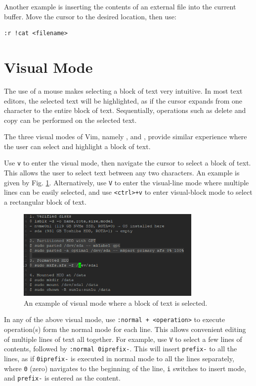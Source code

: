 Another example is inserting the contents of an external file into the current buffer. Move the cursor to the desired location, then use:
\begin{lstlisting}
:r !cat <filename>
\end{lstlisting}

\section{Visual Mode}

The use of a mouse makes selecting a block of text very intuitive. In most text editors, the selected text will be highlighted, as if the cursor expands from one character to the entire block of text. Sequentially, operations such as delete and copy can be performed on the selected text.

The three visual modes of Vim, namely ,  and , provide similar experience where the user can select and highlight a block of text.

Use \verb|v| to enter the visual mode, then navigate the cursor to select a block of text. This allows the user to select text between any two characters. An example is given by Fig. \ref{ch:tfe:fig:vimvm1}. Alternatively, use \verb|V| to enter the visual-line mode where multiple lines can be easily selected, and use \verb|<ctrl>+v| to enter visual-block mode to select a rectangular block of text.

\begin{figure}[htbp]
	\centering
	\includegraphics[width=0.8\textwidth]{chapters/part-1/figures/vimvm1.png}
	\caption{An example of visual mode where a block of text is selected.} \label{ch:tfe:fig:vimvm1}
\end{figure}

In any of the above visual mode, use \verb|:normal + <operation>| to execute operation(s) form the normal mode for each line. This allows convenient editing of multiple lines of text all together. For example, use \verb|V| to select a few lines of contents, followed by \verb|:normal 0iprefix-|. This will insert \verb|prefix-| to all the lines, as if \verb|0iprefix-| is executed in normal mode to all the lines separately, where \verb|0| (zero) navigates to the beginning of the line, \verb|i| switches to insert mode, and \verb|prefix-| is entered as the content.

